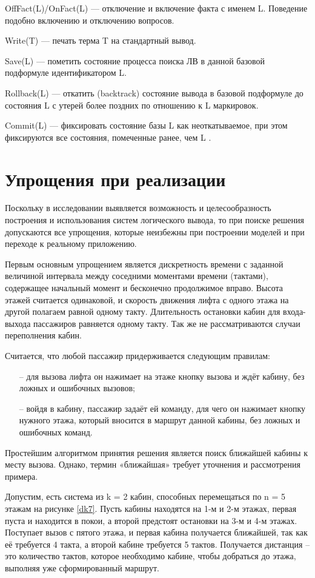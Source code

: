 OffFact(L)/OnFact(L) — отключение и включение факта с именем L. Поведение подобно включению и отключению вопросов.

Write(T) — печать терма T на стандартный вывод.

Save(L) — пометить состояние процесса поиска ЛВ в данной базовой подформуле идентификатором L.

Rollback(L) — откатить (backtrack) состояние вывода в базовой подформуле до состояния L с утерей более поздних по отношению к L маркировок.

Commit(L) — фиксировать состояние базы L как неоткатываемое, при этом фиксируются все состояния, помеченные ранее, чем L .
 
    
\section{Упрощения при реализации}
Поскольку в исследовании выявляется возможность и целесообразность построения и использования систем логического вывода, то при поиске решения допускаются все упрощения, которые неизбежны при построении моделей и при переходе к реальному приложению.

	Первым основным упрощением является дискретность времени с заданной величиной интервала между
		соседними моментами времени (тактами), содержащее начальный момент и бесконечно продолжимое вправо.
		Высота этажей считается одинаковой, и скорость движения лифта с одного этажа на другой полагаем
		равной одному такту. Длительность остановки кабин для входа-выхода пассажиров равняется одному такту.
		Так же не рассматриваются случаи переполнения кабин.

	Считается, что любой пассажир придерживается следующим правилам:
    
    \begin{itemize}
				\item[--] для вызова лифта он нажимает на этаже кнопку вызова и ждёт кабину, без ложных и ошибочных вызовов;
				\item[--] войдя в кабину, пассажир задаёт ей команду, для чего он нажимает кнопку нужного этажа, который вносится в маршрут данной кабины, без ложных и ошибочных команд.
    \end{itemize}

	Простейшим алгоритмом принятия решения является поиск ближайшей кабины к месту вызова.
		Однако, термин «ближайшая» требует уточнения и рассмотрения примера. 

	Допустим, есть система из k = 2 кабин, способных перемещаться по n = 5 этажам на рисунке \ref{dk7}.
		Пусть кабины находятся на 1-м и 2-м этажах, первая пуста и находится в покои,
		а второй предстоят остановки на 3-м и 4-м этажах. Поступает вызов с пятого этажа,
		и первая кабина получается ближайшей, так как её требуется 4 такта,
		а второй кабине требуется 5 тактов. Получается дистанция – это количество тактов,
		которое необходимо кабине, чтобы добраться до этажа, выполняя уже сформированный маршрут.
        
